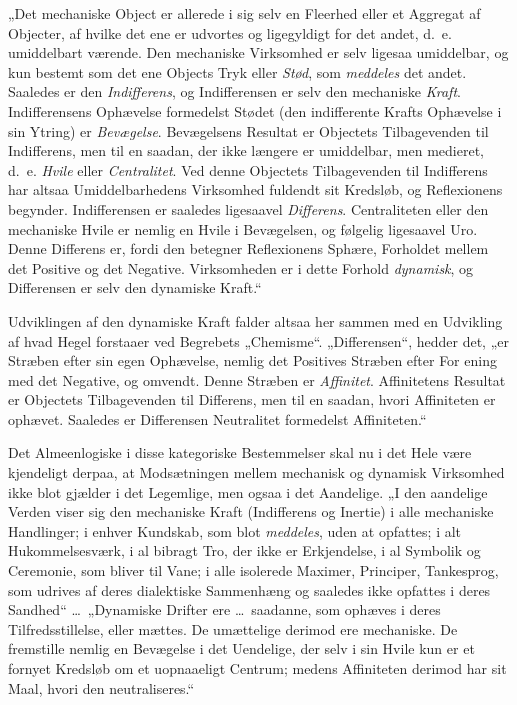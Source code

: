 \documentclass[12pt]{book}
\newcommand{\apage}[1]{\marginnote{\footnotesize\textit{[#1]}}}
\begin{document}
„Det mechaniske Object er allerede i sig selv en Fleerhed eller et Aggregat af
Objecter, af hvilke det ene er udvortes og ligegyldigt for det andet, d.\ e.
umiddelbart værende. Den mechaniske Virksomhed er selv ligesaa umiddelbar, og kun
bestemt som det ene Objects Tryk eller \emph{Stød}, som \emph{meddeles} det andet.
Saaledes er den \emph{Indifferens}, og Indifferensen er selv den mechaniske
\emph{Kraft}. Indifferensens Ophævelse formedelst Stødet (den indifferente Krafts
Ophævelse i sin Ytring) er \emph{Bevægelse}. Bevægelsens Resultat er Objectets
Tilbagevenden til Indifferens, men til en saadan, der ikke længere er umiddelbar, men
medieret, d.\ e. \emph{Hvile} eller \emph{Centralitet}. Ved denne Objectets
Tilbagevenden til Indifferens har altsaa Umiddelbarhedens Virksomhed fuldendt sit
Kredsløb, og Reflexionens begynder. Indifferensen er saaledes ligesaavel
\emph{Differens}. Centraliteten eller den mechaniske Hvile er nemlig en Hvile i
Bevægelsen, og følgelig ligesaavel Uro. Denne Differens er, fordi den betegner
Reflexionens Sphære, Forholdet mellem det Positive og det Negative. Virksomheden er i
dette Forhold \emph{dynamisk}, og Differensen er selv den dynamiske Kraft.“

Udviklingen af den dynamiske Kraft falder altsaa her sammen med en Udvikling af hvad
Hegel forstaaer ved Begrebets „Chemisme“. „Differensen“, hedder det, „er Stræben efter
sin egen Ophævelse, nemlig det Positives Stræben efter For\-%
ening \apage{331} med det Negative, og omvendt. Denne Stræben er \emph{Affinitet}. Affinitetens
Resultat er Objectets Tilbagevenden til Differens, men til en saadan, hvori
Affiniteten er ophævet. Saaledes er Differensen Neutralitet formedelst Affiniteten.“

Det Almeenlogiske i disse kategoriske Bestemmelser skal nu i det Hele være kjendeligt
derpaa, at Modsætningen mellem mechanisk og dynamisk Virksomhed ikke blot gjælder i
det Legemlige, men ogsaa i det Aandelige. „I den aandelige Verden viser sig den
mechaniske Kraft (Indifferens og Inertie) i alle mechaniske Handlinger; i enhver
Kundskab, som blot \emph{meddeles}, uden at opfattes; i alt Hukommelsesværk, i al
bibragt Tro, der ikke er Erkjendelse, i al Symbolik og Ceremonie, som bliver til Vane;
i alle isolerede Maximer, Principer, Tankesprog, som udrives af deres dialektiske
Sammenhæng og saaledes ikke opfattes i deres Sandhed“ \ldots\ „Dynamiske Drifter ere
\ldots\ saadanne, som ophæves i deres Tilfredsstillelse, eller mættes. De umættelige
derimod ere mechaniske. De fremstille nemlig en Bevægelse i det Uendelige, der selv i
sin Hvile kun er et fornyet Kredsløb om et uopnaaeligt Centrum; medens Affiniteten
derimod har sit Maal, hvori den neutraliseres.“
\end{document}
